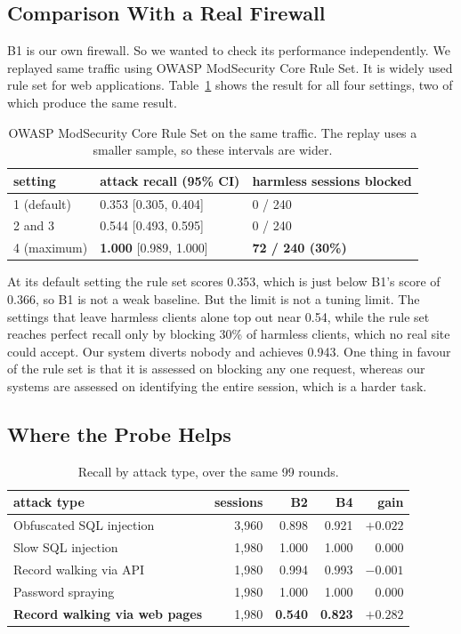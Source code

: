 \documentclass[runningheads]{llncs}
\begin{document}
\subsection{Comparison With a Real Firewall}
B1 is our own firewall. So we wanted to check its performance independently. We replayed same traffic using OWASP ModSecurity Core Rule Set. It is widely used rule set for web applications. Table~\ref{tab:crs} shows the result for all four settings, two of which produce the same result.

\begin{table}[t]
\centering
\caption{OWASP ModSecurity Core Rule Set on the same traffic. The replay uses a smaller
sample, so these intervals are wider.}
\label{tab:crs}
\begin{tabular}{@{}lll@{}}
\toprule
setting & attack recall (95\% CI) & harmless sessions blocked \\
\midrule
1 (default) & 0.353 [0.305, 0.404] & 0 / 240 \\
2 and 3     & 0.544 [0.493, 0.595] & 0 / 240 \\
4 (maximum) & \textbf{1.000} [0.989, 1.000] & \textbf{72 / 240 (30\%)} \\
\bottomrule
\end{tabular}
\end{table}

At its default setting the rule set scores 0.353, which is just below B1's score of 0.366, so B1 is not a weak baseline. But the limit is not a tuning limit. The settings that leave harmless clients alone top out near 0.54, while the rule set reaches perfect recall only by blocking 30\% of harmless clients, which no real site could accept. Our system diverts nobody and achieves 0.943. One thing in favour of the rule set is that it is assessed on blocking any one request, whereas our systems are assessed on identifying the entire session, which is a harder task.

\subsection{Where the Probe Helps}

\begin{table}[t]
\centering
\caption{Recall by attack type, over the same 99 rounds.}
\label{tab:where}
\begin{tabular}{@{}lrrrr@{}}
\toprule
attack type & sessions & B2 & B4 & gain \\
\midrule
Obfuscated SQL injection & 3{,}960 & 0.898 & 0.921 & $+0.022$ \\
Slow SQL injection       & 1{,}980 & 1.000 & 1.000 & $0.000$ \\
Record walking via API   & 1{,}980 & 0.994 & 0.993 & $-0.001$ \\
Password spraying        & 1{,}980 & 1.000 & 1.000 & $0.000$ \\
\textbf{Record walking via web pages} & 1{,}980 & \textbf{0.540} & \textbf{0.823} & $\mathbf{+0.282}$ \\
\bottomrule
\end{tabular}
\end{table}
\end{document}
